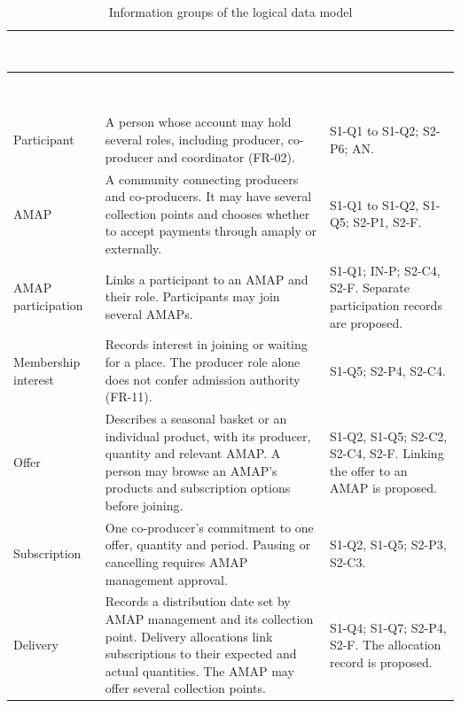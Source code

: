\documentclass[11pt,a4paper]{article}
\begin{document}
{\footnotesize
\begin{longtable}{>{\raggedright\arraybackslash\hspace{0pt}}p{}>{\raggedright\arraybackslash\hspace{0pt}}p{}>{\raggedright\arraybackslash\hspace{0pt}}p{}}
\caption{Information groups of the logical data model}\\
\rowcolor{hdr}\textcolor{white}{\textbf{Information group}} & \textcolor{white}{\textbf{What it represents}} & \textcolor{white}{\textbf{Source or reasoning}} \\ \endfirsthead
\rowcolor{hdr}\textcolor{white}{\textbf{Information group}} & \textcolor{white}{\textbf{What it represents}} & \textcolor{white}{\textbf{Source or reasoning}} \\ \endhead
Participant & A person whose account may hold several roles, including producer, co-producer and coordinator (FR-02). & S1-Q1 to S1-Q2; S2-P6; AN. \\ \hline
AMAP & A community connecting producers and co-producers. It may have several collection points and chooses whether to accept payments through amaply or externally. & S1-Q1 to S1-Q2, S1-Q5; S2-P1, S2-F. \\ \hline
AMAP participation & Links a participant to an AMAP and their role. Participants may join several AMAPs. & S1-Q1; IN-P; S2-C4, S2-F. Separate participation records are proposed. \\ \hline
Membership interest & Records interest in joining or waiting for a place. The producer role alone does not confer admission authority (FR-11). & S1-Q5; S2-P4, S2-C4. \\ \hline
Offer & Describes a seasonal basket or an individual product, with its producer, quantity and relevant AMAP. A person may browse an AMAP's products and subscription options before joining. & S1-Q2, S1-Q5; S2-C2, S2-C4, S2-F. Linking the offer to an AMAP is proposed. \\ \hline
Subscription & One co-producer's commitment to one offer, quantity and period. Pausing or cancelling requires AMAP management approval. & S1-Q2, S1-Q5; S2-P3, S2-C3. \\ \hline
Delivery & Records a distribution date set by AMAP management and its collection point. Delivery allocations link subscriptions to their expected and actual quantities. The AMAP may offer several collection points. & S1-Q4; S1-Q7; S2-P4, S2-F. The allocation record is proposed. \\ \hline

\end{longtable}}
\end{document}

